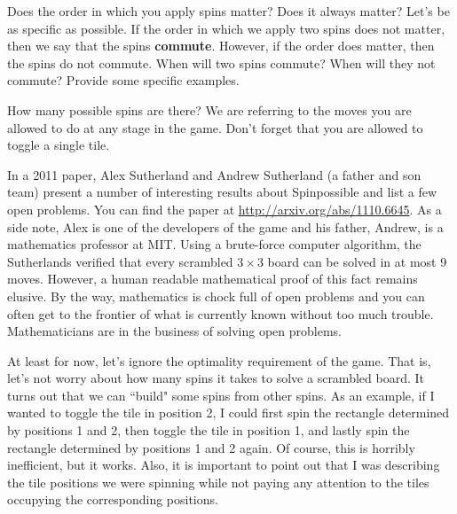 \begin{exercise}
Does the order in which you apply spins matter?  Does it always matter?  Let's be as specific as possible.  If the order in which we apply two spins does not matter, then we say that the spins \textbf{commute}.  However, if the order does matter, then the spins do not commute.  When will two spins commute?  When will they not commute?  Provide some specific examples.
\end{exercise}

\begin{exercise}\label{exer:counting_spins}
How many possible spins are there?  We are referring to the moves you are allowed to do at any stage in the game.  Don't forget that you are allowed to toggle a single tile.
\end{exercise}

In a 2011 paper, Alex Sutherland and Andrew Sutherland (a father and son team) present a number of interesting results about Spinpossible and list a few open problems. You can find the paper at \url{http://arxiv.org/abs/1110.6645}. As a side note, Alex is one of the developers of the game and his father, Andrew, is a mathematics professor at MIT. Using a brute-force computer algorithm, the Sutherlands verified that every scrambled $3\times 3$ board can be solved in at most 9 moves. However, a human readable mathematical proof of this fact remains elusive.  By the way, mathematics is chock full of open problems and you can often get to the frontier of what is currently known without too much trouble.  Mathematicians are in the business of solving open problems.

At least for now, let's ignore the optimality requirement of the game.  That is, let's not worry about how many spins it takes to solve a scrambled board.  It turns out that we can ``build" some spins from other spins.  As an example, if I wanted to toggle the tile in position 2, I could first spin the rectangle determined by positions 1 and 2, then toggle the tile in position 1, and lastly spin the rectangle determined by positions 1 and 2 again.  Of course, this is horribly inefficient, but it works.  Also, it is important to point out that I was describing the tile positions we were spinning while not paying any attention to the tiles occupying the corresponding positions.

